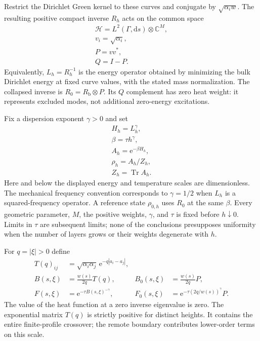 \documentclass[aps,pra,reprint,superscriptaddress,longbibliography]{revtex4-2}
\newcommand{\Tr}{\operatorname{Tr}}
\newcommand{\dd}{\mathrm d}
\newcommand{\ee}{\mathrm e}
\begin{document}
Restrict the Dirichlet Green kernel to these curves and conjugate by
$\sqrt{\alpha_iw}$. The resulting positive compact inverse $R_h$ acts on
the common space
\begin{equation}
\begin{gathered}
 \mathcal H=L^2(\Gamma,\dd s)\otimes\mathbb C^M,
 \\
 v_i=\sqrt{\alpha_i},\\
 P=vv^*,\\
 Q=I-P.
 \label{sgt:main:alignment}
\end{gathered}
\end{equation}
Equivalently, $L_h=R_h^{-1}$ is the energy operator obtained by minimizing
the bulk Dirichlet energy at fixed curve values, with the stated mass
normalization. The collapsed inverse is $R_0=R_{\mathrm b}\otimes P$.
Its $Q$ complement has zero heat weight: it represents excluded modes,
not additional zero-energy excitations.

Fix a dispersion exponent $\gamma>0$ and set
\begin{equation}
\begin{gathered}
 H_h=L_h^\gamma,\\
 \beta=\tau h^\gamma,\\
 A_h=\ee^{-\beta H_h},\\
 \rho_h=A_h/Z_h,\\
 Z_h=\Tr A_h .
 \label{sgt:main:state}
\end{gathered}
\end{equation}
Here and below the displayed energy and temperature scales are
dimensionless. The mechanical frequency convention corresponds to
$\gamma=1/2$ when $L_h$ is a squared-frequency operator. A reference
state $\rho_{0,h}$ uses $R_0$ at the same $\beta$. Every geometric
parameter, $M$, the positive weights, $\gamma$, and $\tau$ is fixed
before $h\downarrow0$. Limits in $\tau$ are subsequent limits; none of
the conclusions presupposes uniformity when the number of layers grows
or their weights degenerate with $h$.

For $q=|\xi|>0$ define
\begin{align}
 T(q)_{ij}&=\sqrt{\alpha_i\alpha_j}\,
               \ee^{-q|a_i-a_j|},\nonumber\\
 B(s,\xi)&=\frac{w(s)}{2q}T(q),
 &B_0(s,\xi)&=\frac{w(s)}{2q}P,\nonumber\\
 F(s,\xi)&=\ee^{-\tau B(s,\xi)^{-\gamma}},
 &F_0(s,\xi)&=\ee^{-\tau(2q/w(s))^\gamma}P.
 \label{sgt:main:symbol}
\end{align}
The value of the heat function at a zero inverse eigenvalue is zero.
The exponential matrix $T(q)$ is strictly positive for distinct heights.
It contains the entire finite-profile crossover; the remote boundary
contributes lower-order terms on this scale.
\end{document}
